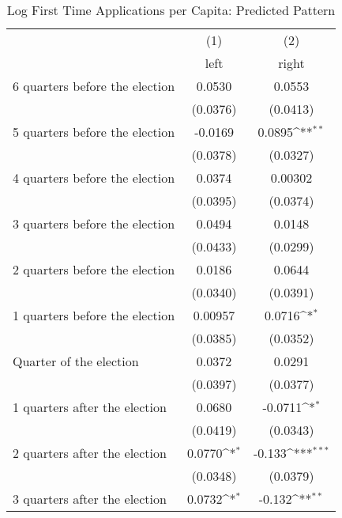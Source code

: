 \begin{table}[htbp]\centering
\def\sym#1{\ifmmode^{#1}\else\(^{#1}\)\fi}
\caption{Log First Time Applications per Capita: Predicted Pattern}
\begin{tabular}{l*{2}{c}}
\hline\hline
                    &\multicolumn{1}{c}{(1)}&\multicolumn{1}{c}{(2)}\\
                    &\multicolumn{1}{c}{left}&\multicolumn{1}{c}{right}\\
\hline
 6 quarters before the election&      0.0530         &      0.0553         \\
                    &    (0.0376)         &    (0.0413)         \\
[1em]
 5 quarters before the election&     -0.0169         &      0.0895\sym{**} \\
                    &    (0.0378)         &    (0.0327)         \\
[1em]
 4 quarters before the election&      0.0374         &     0.00302         \\
                    &    (0.0395)         &    (0.0374)         \\
[1em]
 3 quarters before the election&      0.0494         &      0.0148         \\
                    &    (0.0433)         &    (0.0299)         \\
[1em]
 2 quarters before the election&      0.0186         &      0.0644         \\
                    &    (0.0340)         &    (0.0391)         \\
[1em]
 1 quarters before the election&     0.00957         &      0.0716\sym{*}  \\
                    &    (0.0385)         &    (0.0352)         \\
[1em]
Quarter of the election&      0.0372         &      0.0291         \\
                    &    (0.0397)         &    (0.0377)         \\
[1em]
 1 quarters after the election&      0.0680         &     -0.0711\sym{*}  \\
                    &    (0.0419)         &    (0.0343)         \\
[1em]
 2 quarters after the election&      0.0770\sym{*}  &      -0.133\sym{***}\\
                    &    (0.0348)         &    (0.0379)         \\
[1em]
 3 quarters after the election&      0.0732\sym{*}  &      -0.132\sym{**} \\

\end{tabular}
\end{table}
